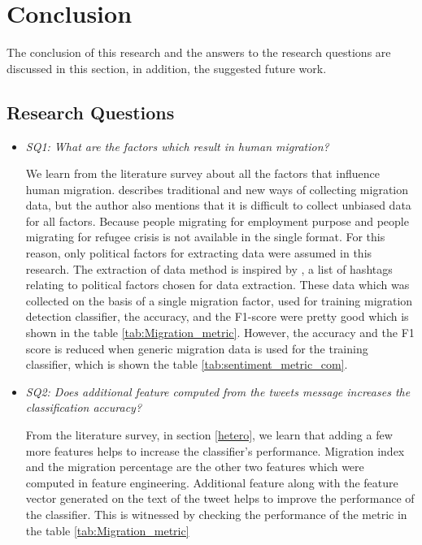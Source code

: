 \chapter{Conclusion}\label{chap:conclusion}

The conclusion of this research and the answers to the research questions are discussed in this section, in addition, the suggested future work.

\section{Research Questions}


\begin{itemize}
    \item \textit{SQ1: What are the factors which result in human migration?}
    
    We learn from the literature survey about all the factors that influence human migration. \cite{Christina_Hughes_et_al.} describes traditional and new ways of collecting migration data, but the author also mentions that it is difficult to collect unbiased data for all factors. Because people migrating for employment purpose and people migrating for refugee crisis is not available in the single format. For this reason, only political factors for extracting data were assumed in this research. The extraction of data method is inspired by \cite{Cortis}, a list of hashtags relating to political factors chosen for data extraction. These data which was collected on the basis of a single migration factor, used for training migration detection classifier, the accuracy, and the F1-score were pretty good which is shown in the table \ref{tab:Migration_metric}. However, the accuracy and the F1 score is reduced when generic migration data is used for the training classifier, which is shown the table \ref{tab:sentiment_metric_com}.
    
    \item \textit{SQ2: Does additional feature computed from the tweets message increases the classification accuracy?}
    
  
    
    From the literature survey, in section \ref{hetero}, we learn that adding a few more features helps to increase the classifier's performance. Migration index and the migration percentage are the other two features which were computed in feature engineering. Additional feature along with the feature vector generated on the text of the tweet helps to improve the performance of the classifier. This is witnessed by checking the performance of the metric in the table \ref{tab:Migration_metric}
    

\end{itemize}
